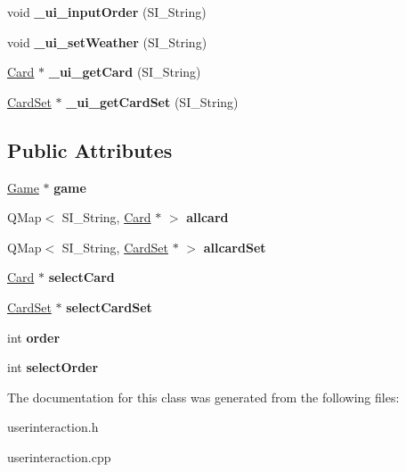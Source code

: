 \begin{DoxyCompactItemize}
\item 
\mbox{\label{class_user_interaction_a500339bde70269c74ed8abff53b14e9e}} 
void {\bfseries \+\_\+ui\+\_\+input\+Order} (S\+I\+\_\+\+String)
\item 
\mbox{\label{class_user_interaction_ac9f6b42ab3fc4e5522126ccb1af2ae49}} 
void {\bfseries \+\_\+ui\+\_\+set\+Weather} (S\+I\+\_\+\+String)
\item 
\mbox{\label{class_user_interaction_a1ca2c59e135557f11304096288d1bd5a}} 
\hyperlink{class_card}{Card} $\ast$ {\bfseries \+\_\+ui\+\_\+get\+Card} (S\+I\+\_\+\+String)
\item 
\mbox{\label{class_user_interaction_aa2951c316e4e0abdf5b360a6eaa97041}} 
\hyperlink{class_card_set}{Card\+Set} $\ast$ {\bfseries \+\_\+ui\+\_\+get\+Card\+Set} (S\+I\+\_\+\+String)
\end{DoxyCompactItemize}
\subsection*{Public Attributes}
\begin{DoxyCompactItemize}
\item 
\mbox{\label{class_user_interaction_a6788061b735de7f1a86180b2fa4982c1}} 
\hyperlink{class_game}{Game} $\ast$ {\bfseries game}
\item 
\mbox{\label{class_user_interaction_a7556c0bd15ef97e97013023bafc3789e}} 
Q\+Map$<$ S\+I\+\_\+\+String, \hyperlink{class_card}{Card} $\ast$ $>$ {\bfseries allcard}
\item 
\mbox{\label{class_user_interaction_af5f1fcd093ac9421134b4f6f7bec4b10}} 
Q\+Map$<$ S\+I\+\_\+\+String, \hyperlink{class_card_set}{Card\+Set} $\ast$ $>$ {\bfseries allcard\+Set}
\item 
\mbox{\label{class_user_interaction_a4c4fac6dbb812a67cd77a38254a0832d}} 
\hyperlink{class_card}{Card} $\ast$ {\bfseries select\+Card}
\item 
\mbox{\label{class_user_interaction_ada8ebc31b29a7f11b31004bf95597b94}} 
\hyperlink{class_card_set}{Card\+Set} $\ast$ {\bfseries select\+Card\+Set}
\item 
\mbox{\label{class_user_interaction_a7defc51f58f88b3b86934bc474bd0ddc}} 
int {\bfseries order}
\item 
\mbox{\label{class_user_interaction_a4d27dc71921d976628c6e89cd811b8a2}} 
int {\bfseries select\+Order}
\end{DoxyCompactItemize}


The documentation for this class was generated from the following files\+:\begin{DoxyCompactItemize}
\item 
userinteraction.\+h\item 
userinteraction.\+cpp\end{DoxyCompactItemize}
